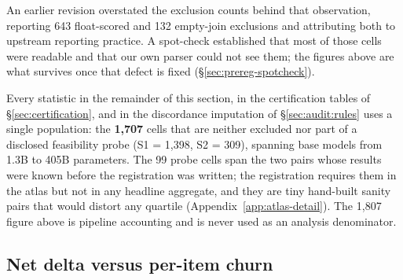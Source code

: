An earlier revision overstated the exclusion counts behind that observation,
reporting 643 float-scored and 132 empty-join exclusions and attributing both to
upstream reporting practice. A spot-check established that most of those cells
were readable and that our own parser could not see them; the figures above are
what survives once that defect is fixed (\S\ref{sec:prereg-spotcheck}).

Every statistic in the remainder of this section, in the certification tables of
\S\ref{sec:certification}, and in the discordance imputation of
\S\ref{sec:audit:rules} uses a single population: the \textbf{1{,}707} cells that
are neither excluded nor part of a disclosed feasibility probe
(S1 = 1{,}398, S2 = 309), spanning base models from 1.3B to 405B parameters. The
99 probe cells span the two pairs whose results were known before the
registration was written; the registration requires them in the atlas but not in
any headline aggregate, and they are tiny hand-built sanity pairs that would
distort any quartile (Appendix~\ref{app:atlas-detail}). The 1{,}807 figure above
is pipeline accounting and is never used as an analysis denominator.

\subsection{Net delta versus per-item churn}
\label{sec:atlas:netgross}

